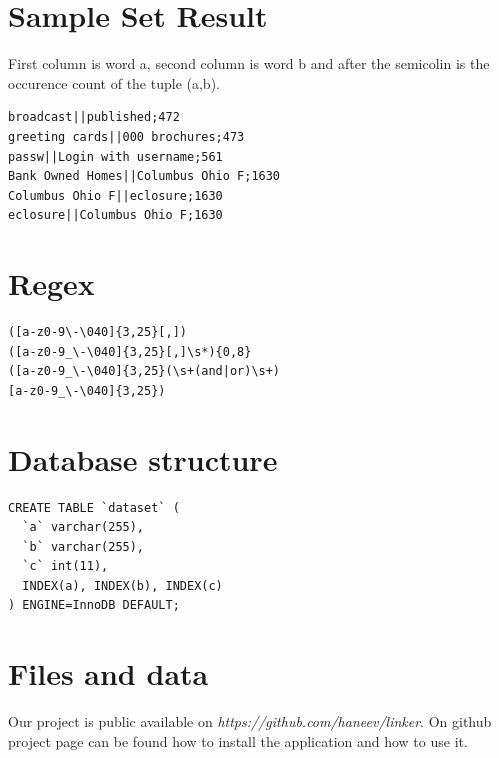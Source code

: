 \documentclass{sig-alternate}
\begin{document}



\balancecolumns
\appendix

\section{Sample Set Result}\label{app:testset}
First column is word a, second column is word b and after the semicolin is the occurence count of the tuple (a,b).
\begin{lstlisting}
broadcast||published;472
greeting cards||000 brochures;473
passw||Login with username;561
Bank Owned Homes||Columbus Ohio F;1630
Columbus Ohio F||eclosure;1630
eclosure||Columbus Ohio F;1630
\end{lstlisting}

\section{Regex}\label{app:regex}
\begin{lstlisting}
([a-z0-9\-\040]{3,25}[,])
([a-z0-9_\-\040]{3,25}[,]\s*){0,8}
([a-z0-9_\-\040]{3,25}(\s+(and|or)\s+)
[a-z0-9_\-\040]{3,25})
\end{lstlisting}

\section{Database structure}
\begin{lstlisting}
CREATE TABLE `dataset` (
  `a` varchar(255),
  `b` varchar(255),
  `c` int(11),
  INDEX(a), INDEX(b), INDEX(c)
) ENGINE=InnoDB DEFAULT;
\end{lstlisting}

\section{Files and data}\label{app:data}
Our project is public available on \emph{https://github.com/haneev/linker}. On github project page can be found how to install the application and how to use it. 

\balancecolumns
\end{document}
